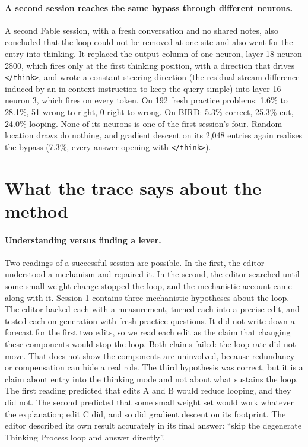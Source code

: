 \documentclass[11pt]{article}
\newcommand{\think}{\texttt{</think>}}
\begin{document}
\paragraph{A second session reaches the same bypass through different neurons.} A second Fable session, with a fresh conversation and no shared notes, also concluded that the loop could not be removed at one site and also went for the entry into thinking. It replaced the output column of one neuron, layer 18 neuron 2800, which fires only at the first thinking position, with a direction that drives \think{}, and wrote a constant steering direction (the residual-stream difference induced by an in-context instruction to keep the query simple) into layer 16 neuron 3, which fires on every token. On 192 fresh practice problems: 1.6\% to 28.1\%, 51 wrong to right, 0 right to wrong. On BIRD: 5.3\% correct, 25.3\% cut, 24.0\% looping. None of its neurons is one of the first session's four. Random-location draws do nothing, and gradient descent on its 2,048 entries again realises the bypass (7.3\%, every answer opening with \think{}).

\section{What the trace says about the method}\label{sec:what}

\paragraph{Understanding versus finding a lever.} Two readings of a successful session are possible. In the first, the editor understood a mechanism and repaired it. In the second, the editor searched until some small weight change stopped the loop, and the mechanistic account came along with it. Session 1 contains three mechanistic hypotheses about the loop. The editor backed each with a measurement, turned each into a precise edit, and tested each on generation with fresh practice questions. It did not write down a forecast for the first two edits, so we read each edit as the claim that changing these components would stop the loop. Both claims failed: the loop rate did not move. That does not show the components are uninvolved, because redundancy or compensation can hide a real role. The third hypothesis was correct, but it is a claim about entry into the thinking mode and not about what sustains the loop. The first reading predicted that edits A and B would reduce looping, and they did not. The second predicted that some small weight set would work whatever the explanation; edit C did, and so did gradient descent on its footprint. The editor described its own result accurately in its final answer: ``skip the degenerate Thinking Process loop and answer directly''.
\end{document}
